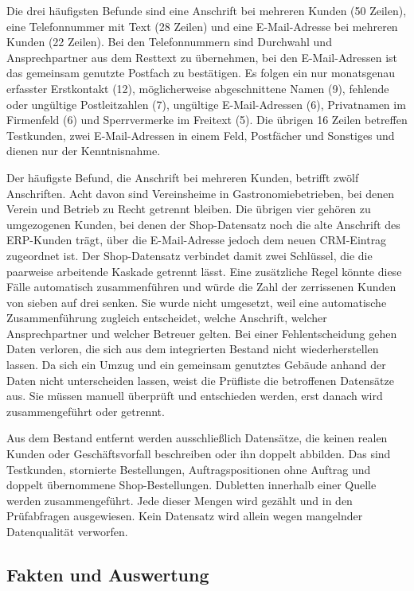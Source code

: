 \documentclass[a4paper,12pt]{article}
\begin{document}
Die drei häufigsten Befunde sind eine Anschrift bei mehreren Kunden (50 Zeilen), eine Telefonnummer mit Text (28 Zeilen) und eine E-Mail-Adresse bei mehreren Kunden (22 Zeilen). Bei den Telefonnummern sind Durchwahl und Ansprechpartner aus dem Resttext zu übernehmen, bei den E-Mail-Adressen ist das gemeinsam genutzte Postfach zu bestätigen. Es folgen ein nur monatsgenau erfasster Erstkontakt (12), möglicherweise abgeschnittene Namen (9), fehlende oder ungültige Postleitzahlen (7), ungültige E-Mail-Adressen (6), Privatnamen im Firmenfeld (6) und Sperrvermerke im Freitext (5). Die übrigen 16 Zeilen betreffen Testkunden, zwei E-Mail-Adressen in einem Feld, Postfächer und Sonstiges und dienen nur der Kenntnisnahme.

Der häufigste Befund, die Anschrift bei mehreren Kunden, betrifft zwölf Anschriften. Acht davon sind Vereinsheime in Gastronomiebetrieben, bei denen Verein und Betrieb zu Recht getrennt bleiben. Die übrigen vier gehören zu umgezogenen Kunden, bei denen der Shop-Datensatz noch die alte Anschrift des ERP-Kunden trägt, über die E-Mail-Adresse jedoch dem neuen CRM-Eintrag zugeordnet ist. Der Shop-Datensatz verbindet damit zwei Schlüssel, die die paarweise arbeitende Kaskade getrennt lässt. Eine zusätzliche Regel könnte diese Fälle automatisch zusammenführen und würde die Zahl der zerrissenen Kunden von sieben auf drei senken. Sie wurde nicht umgesetzt, weil eine automatische Zusammenführung zugleich entscheidet, welche Anschrift, welcher Ansprechpartner und welcher Betreuer gelten. Bei einer Fehlentscheidung gehen Daten verloren, die sich aus dem integrierten Bestand nicht wiederherstellen lassen. Da sich ein Umzug und ein gemeinsam genutztes Gebäude anhand der Daten nicht unterscheiden lassen, weist die Prüfliste die betroffenen Datensätze aus. Sie müssen manuell überprüft und entschieden werden, erst danach wird zusammengeführt oder getrennt.

Aus dem Bestand entfernt werden ausschließlich Datensätze, die keinen realen Kunden oder Geschäftsvorfall beschreiben oder ihn doppelt abbilden. Das sind Testkunden, stornierte Bestellungen, Auftragspositionen ohne Auftrag und doppelt übernommene Shop-Bestellungen. Dubletten innerhalb einer Quelle werden zusammengeführt. Jede dieser Mengen wird gezählt und in den Prüfabfragen ausgewiesen. Kein Datensatz wird allein wegen mangelnder Datenqualität verworfen.

\subsection{Fakten und Auswertung}\label{sec:fakten}
\end{document}
